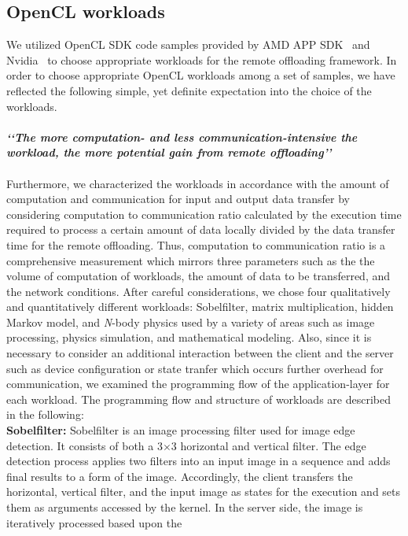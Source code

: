 \documentclass[conference]{IEEEtran}
\begin{document}
\subsection{OpenCL workloads}
We utilized OpenCL SDK code samples provided by AMD APP
SDK~\cite{amd} and Nvidia~\cite{nvidia} to choose appropriate workloads for
the remote offloading framework.
%
In order to choose appropriate OpenCL workloads among a set of samples,
we have reflected the following simple, yet definite expectation into
the choice of the workloads.\\\\
%
\textbf{\textit{\lq\lq The more computation- and less
communication-intensive the workload, the more potential gain from remote
offloading\rq\rq}} \\\\
%
Furthermore, we characterized the workloads in accordance with the
amount of computation and communication for input and output data
transfer by considering computation to communication ratio
calculated by the execution time required to process a certain amount of
data locally divided by the data transfer time for the remote offloading.
%
Thus, computation to communication ratio is a
comprehensive measurement which mirrors three parameters such as the
the volume of computation of workloads, the amount of data to be transferred, and the
network conditions.
%
After careful considerations, we chose four qualitatively and
quantitatively different workloads: Sobelfilter, matrix multiplication,
hidden Markov model, and \textit{N}-body physics used by a variety of areas such as
image processing, physics simulation, and mathematical modeling.
%
Also, since it is necessary to consider an additional interaction 
between the client and the server such as device configuration 
or state tranfer which occurs further overhead for communication, 
we examined the programming flow of the application-layer for each workload.
%
The programming flow and structure of workloads are described in the following:\\
%
\textbf{Sobelfilter:} Sobelfilter is an image processing filter used for
image edge detection.
%
It consists of both a 3$\times$3 horizontal and vertical filter.
%
The edge detection process applies two filters into an input image in a
sequence and adds final results to a form of the image.
%
Accordingly, the client transfers the horizontal, vertical filter, and
the input image as states for the execution and sets them as arguments
accessed by the kernel.
%
In the server side, the image is iteratively processed based upon the
\end{document}
